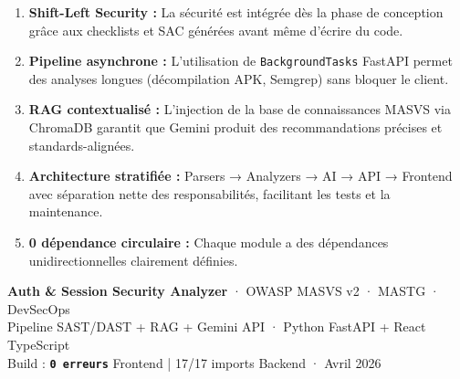 \documentclass[12pt,a4paper,french]{article}
\begin{document}
\begin{enumerate}[leftmargin=1.8cm, itemsep=6pt]
  \item \textbf{Shift-Left Security :} La sécurité est intégrée dès la phase de conception
    grâce aux checklists et SAC générées avant même d'écrire du code.

  \item \textbf{Pipeline asynchrone :} L'utilisation de \texttt{BackgroundTasks} FastAPI
    permet des analyses longues (décompilation APK, Semgrep) sans bloquer le client.

  \item \textbf{RAG contextualisé :} L'injection de la base de connaissances MASVS via
    ChromaDB garantit que Gemini produit des recommandations précises et standards-alignées.

  \item \textbf{Architecture stratifiée :} Parsers → Analyzers → AI → API → Frontend
    avec séparation nette des responsabilités, facilitant les tests et la maintenance.

  \item \textbf{0 dépendance circulaire :} Chaque module a des dépendances unidirectionnelles
    clairement définies.
\end{enumerate}

\vspace{1cm}

\begin{tcolorbox}[
  enhanced,
  colback=darkbg,
  colframe=primary,
  fontupper=\color{white}\small,
  arc=8pt, boxrule=0.8pt,
  left=10pt, right=10pt, top=8pt, bottom=8pt
]
\textbf{Auth \& Session Security Analyzer} · OWASP MASVS v2 · MASTG · DevSecOps\\
\textcolor{mutedtxt}{Pipeline SAST/DAST + RAG + Gemini API · Python FastAPI + React TypeScript}\\
\textcolor{mutedtxt}{Build : \texttt{\textbf{0 erreurs}} Frontend | 17/17 imports Backend · Avril 2026}
\end{tcolorbox}
\end{document}

